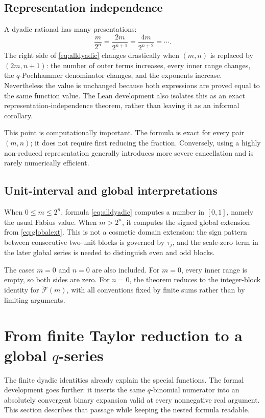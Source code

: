 \documentclass[11pt,oneside]{article}
\theoremstyle{definition}
\theoremstyle{remark}
\newcommand{\G}{\widetilde{\mathcal F}}
\newcommand{\tm}{\tau}
\begin{document}
\subsection{Representation independence}

A dyadic rational has many presentations:
\[
 \frac{m}{2^n}=\frac{2m}{2^{n+1}}=\frac{4m}{2^{n+2}}=\cdots.
\]
The right side of \eqref{eq:alldyadic} changes drastically when $(m,n)$ is
replaced by $(2m,n+1)$: the number of outer terms increases, every inner
range changes, the $q$-Pochhammer denominator changes, and the exponents
increase.  Nevertheless the value is unchanged because both expressions are
proved equal to the same function value.  The Lean development also isolates
this as an exact representation-independence theorem, rather than leaving it
as an informal corollary.

This point is computationally important.  The formula is exact for every
pair $(m,n)$; it does not require first reducing the fraction.  Conversely,
using a highly non-reduced representation generally introduces more severe
cancellation and is rarely numerically efficient.

\subsection{Unit-interval and global interpretations}

When $0\le m\le2^n$, formula \eqref{eq:alldyadic} computes a number in
$[0,1]$, namely the usual Fabius value.  When $m>2^n$, it computes the signed
global extension from \eqref{eq:globalext}.  This is not a cosmetic domain
extension: the sign pattern between consecutive two-unit blocks is governed
by $\tm_j$, and the scale-zero term in the later global series is needed to
distinguish even and odd blocks.

The cases $m=0$ and $n=0$ are also included.  For $m=0$, every inner range
is empty, so both sides are zero.  For $n=0$, the theorem reduces to the
integer-block identity for $\G(m)$, with all conventions fixed by finite sums
rather than by limiting arguments.

\section{From finite Taylor reduction to a global \texorpdfstring{$q$-series}{q-series}}
\label{sec:globalseries}

The finite dyadic identities already explain the special functions.  The
formal development goes further: it inserts the same $q$-binomial numerator
into an absolutely convergent binary expansion valid at every nonnegative
real argument.  This section describes that passage while keeping the nested
formula readable.
\end{document}
